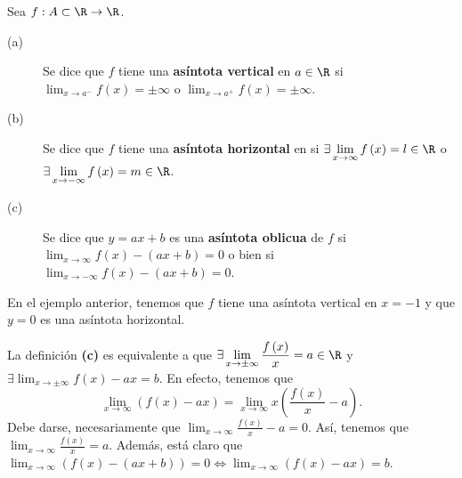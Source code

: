 \begin{fdefinition}[Asíntotas]
\normalfont Sea $\displaystyle f : A \subset \R \to \R $. 
\begin{description}
\item[(a)] Se dice que $\displaystyle f $ tiene una \textbf{asíntota vertical} en $\displaystyle a \in \R $ si $\displaystyle \lim_{x \to a^{-}}f\left(x\right) = \pm \infty $ o $\displaystyle \lim_{x \to a^{+}}f\left(x\right) = \pm \infty  $. \\
\item[(b)] Se dice que $\displaystyle f $ tiene una \textbf{asíntota horizontal} en si $\displaystyle \exists \lim_{x \to \infty}f\left(x\right) = l \in \R $ o $\displaystyle \exists \lim_{x \to -\infty} f\left(x\right) = m \in \R $.
\item[(c)] Se dice que $\displaystyle y = ax + b $ es una \textbf{asíntota oblicua} de $\displaystyle f $ si $\displaystyle \lim_{x \to \infty}f\left(x\right) - \left(ax+b\right) = 0 $ o bien si $\displaystyle \lim_{x \to -\infty}f\left(x\right)-\left(ax+b\right) = 0 $.
\end{description}
\end{fdefinition}
\begin{observation}
\normalfont En el ejemplo anterior, tenemos que $\displaystyle f $ tiene una asíntota vertical en $\displaystyle x = -1 $ y que $\displaystyle y = 0 $ es una asíntota horizontal.
\end{observation}
\begin{observation}
\normalfont La definición \textbf{(c)} es equivalente a que $\displaystyle \exists \lim_{x \to \pm\infty}\frac{f\left(x\right)}{x} = a \in \R $ y $\displaystyle \exists \lim_{x \to \pm\infty}f\left(x\right)-ax = b $. En efecto, tenemos que 
\[\lim_{x \to \infty}\left(f\left(x\right)-ax\right) = \lim_{x \to \infty} x\left(\frac{f\left(x\right)}{x}-a\right) .\]
Debe darse, necesariamente que $\displaystyle \lim_{x \to \infty}\frac{f\left(x\right)}{x}-a = 0 $. Así, tenemos que $\displaystyle \lim_{x \to \infty}\frac{f\left(x\right)}{x} = a $. Además, está claro que $\displaystyle \lim_{x \to \infty}\left(f\left(x\right)-\left(ax + b\right)\right) = 0 \iff \lim_{x \to \infty}\left(f\left(x\right)-ax\right) = b $.
\end{observation}
